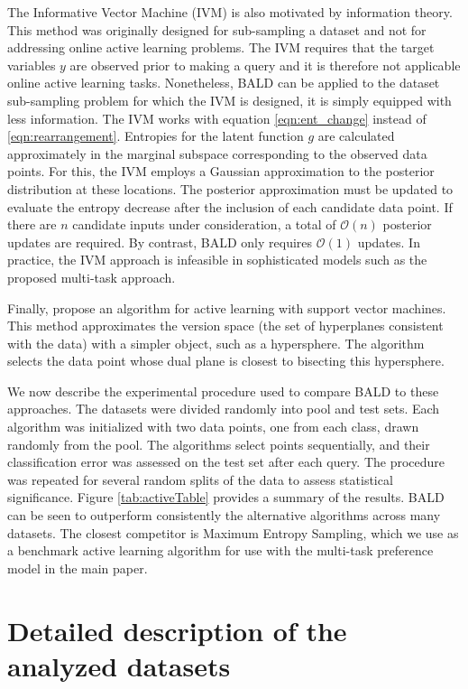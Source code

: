 \documentclass{article}
\begin{document}
The Informative Vector Machine (IVM) \citep{lawrence2002} is also motivated by information theory.
This method was originally designed for sub-sampling a dataset and not for addressing online active learning problems.
The IVM requires that the target variables $y$ are observed prior to making a query and it is therefore not applicable online active learning tasks.
Nonetheless, BALD can be applied to the dataset sub-sampling problem for which the IVM is designed, it is simply equipped with less information.
The IVM works with equation \eqref{eqn:ent_change} instead of \eqref{eqn:rearrangement}. Entropies for the latent function $g$ are
calculated approximately in the marginal subspace corresponding to the observed data points.
For this, the IVM employs a Gaussian approximation to the posterior distribution at these locations.
The posterior approximation must be updated to evaluate the entropy decrease after the inclusion
of each candidate data point. If there are $n$ candidate inputs under consideration, a total of $\mathcal{O}(n)$ posterior
updates are required. By contrast, BALD only requires $\mathcal{O}(1)$ updates.
In practice, the IVM approach is infeasible in sophisticated models such as the proposed multi-task approach.

Finally, \cite{tong2001} propose an algorithm for active learning with support vector machines.
This method approximates the version space (the set of hyperplanes consistent with the data)
with a simpler object, such as a hypersphere. The algorithm selects the data point whose
dual plane is closest to bisecting this hypersphere. 

We now describe the experimental procedure used to compare BALD to these approaches.
The datasets were divided randomly into pool and test sets.
Each algorithm was initialized with two data points, one from each class, drawn randomly from the pool.
The algorithms select points sequentially, and their classification error was assessed on the test set after each query. The procedure was repeated for several random splits of the data to 
assess statistical significance.
Figure \ref{tab:activeTable} provides a summary of the results. 
BALD can be seen to outperform consistently the alternative algorithms across many datasets. The closest competitor is Maximum Entropy Sampling, which we use as a benchmark active learning algorithm for use with the multi-task preference model in the main paper. 



\section{Detailed description of the analyzed datasets}
\end{document}
